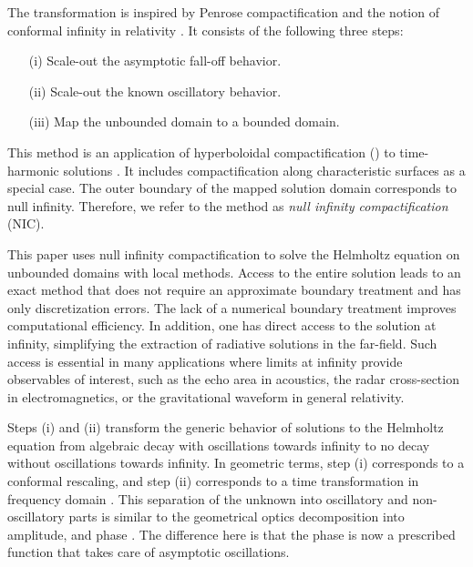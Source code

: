 \documentclass[final,onefignum,onetabnum]{siamart190516}
\begin{document}
The transformation is inspired by Penrose compactification and the notion of conformal infinity in relativity \cite{Penrose, Penrose65, Frauendiener2004, Winicour2012}. It consists of the following three steps:
\begin{itemize}
	\item[(i)] Scale-out the asymptotic fall-off behavior.
	\item[(ii)] Scale-out the known oscillatory behavior.
	\item[(iii)] Map the unbounded domain to a bounded domain.
\end{itemize}
This method is an application of hyperboloidal compactification (\cite{Zenginoglu08, ZENGINOGLU20112286, Macedo_2020}) to time-harmonic solutions \cite{ZengFramework, ansorg2016spectral, macedo2018hyperboloidal, bizon2020toy, jaramillo2021pseudospectrum, jaramillo2021gravitational, destounis2021pseudospectrum, gasperin2021physical}. It includes compactification along characteristic surfaces as a special case. The outer boundary of the mapped solution domain corresponds to null infinity. Therefore, we refer to the method as \emph{null infinity compactification} (NIC).

This paper uses null infinity compactification to solve the Helmholtz equation on unbounded domains with local methods. Access to the entire solution leads to an exact method that does not require an approximate boundary treatment and has only discretization errors. The lack of a numerical boundary treatment improves computational efficiency. In addition, one has direct access to the solution at infinity, simplifying the extraction of radiative solutions in the far-field. Such access is essential in many applications where limits at infinity provide observables of interest, such as the echo area in acoustics, the radar cross-section in electromagnetics, or the gravitational waveform in general relativity.

Steps (i) and (ii) transform the generic behavior of solutions to the Helmholtz equation from algebraic decay with oscillations towards infinity to no decay without oscillations towards infinity. In geometric terms, step (i) corresponds to a conformal rescaling, and step (ii) corresponds to a time transformation in frequency domain \cite{ZengFramework}. This separation of the unknown into oscillatory and non-oscillatory parts is similar to the geometrical optics decomposition into amplitude, and phase \cite{engquist2003computational}. The difference here is that the phase is now a prescribed function that takes care of asymptotic oscillations. 
\end{document}
